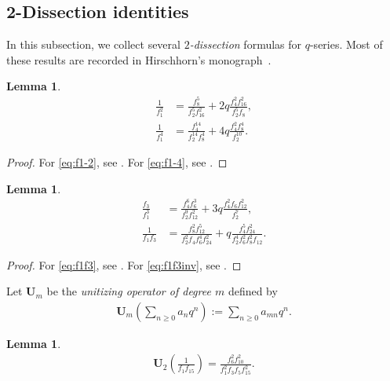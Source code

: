 \documentclass[12pt,reqno]{amsart}
\numberwithin{equation}{section}
\theoremstyle{plain}
\newtheorem{lemma}[theorem]{Lemma}
\theoremstyle{definition}
\theoremstyle{named}
\newcommand{\UU}{\mathbf{U}}
\begin{document}
\subsection{2-Dissection identities}

In this subsection, we collect several \emph{$2$-dissection} formulas for $q$-series. 
Most of these results are recorded in Hirschhorn's monograph~\cite{Hir}.  

\begin{lemma}
	\begin{align}
		\frac{1}{f_1^2}&=\frac{f_8^5}{f_2^5f_{16}^2}+2q\frac{f_4^2f_{16}^2}{f_2^5f_8},\label{eq:f1-2}\\
		\frac{1}{f_1^4}&=\frac{f_4^{14}}{f_2^{14}f_8^4}+4q\frac{f_4^2f_8^4}{f_2^{10}}.\label{eq:f1-4}
	\end{align}
\end{lemma}

\begin{proof}
	For \eqref{eq:f1-2}, see \cite[eq.~(1.9.4)]{Hir}. For \eqref{eq:f1-4}, see \cite[eq.~(1.10.1)]{Hir}.
\end{proof}

\begin{lemma}
	\begin{align}
		\frac{f_3}{f_1^3}&=\frac{f_4^6f_6^3}{f_2^9f_{12}^2}+3q\frac{f_4^2f_6f_{12}^2}{f_2^7},\label{eq:f1f3}\\
		\frac{1}{f_1f_3}&= \frac{f_8^2f_{12}^5}{f_2^2f_4f_6^4f_{24}^2}+q\frac{f_4^5f_{24}^2}{f_2^4f_6^2f_8^2f_{12}}.\label{eq:f1f3inv}
	\end{align}
\end{lemma}

\begin{proof}
	For \eqref{eq:f1f3}, see \cite[eq.~(22.7.3) with $q \mapsto -q$]{Hir}. For \eqref{eq:f1f3inv}, see \cite[eq.~(30.12.3)]{Hir}.
\end{proof}

Let $\UU_m$ be the \emph{unitizing operator of degree $m$} defined by
\begin{align*}
	\UU_m\left(\sum_{n\ge 0} a_n q^n\right) := \sum_{n\ge 0} a_{mn} q^n.
\end{align*}

\begin{lemma}\label{le:H-f1f15}
	\begin{align}\label{eq:H-f1f15}
		\UU_2\left(\frac{1}{f_1 f_{15}}\right) = \frac{f_{6}^2f_{10}^2}{f_1^2f_3f_{5}f_{15}^2}.
	\end{align}
\end{lemma}
\end{document}
